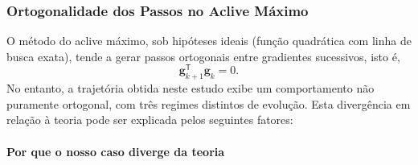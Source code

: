 \documentclass[12pt]{article}
\begin{document}
\subsubsection*{Ortogonalidade dos Passos no Aclive Máximo}

O método do aclive máximo, sob hipóteses ideais (função quadrática com linha de busca exata), tende a gerar passos ortogonais entre gradientes sucessivos, isto é,
\[
\mathbf{g}_{k+1}^{\mathsf T}\mathbf{g}_{k} = 0.
\]
No entanto, a trajetória obtida neste estudo exibe um comportamento não puramente ortogonal, com três regimes distintos de evolução. Esta divergência em relação à teoria pode ser explicada pelos seguintes fatores:

\paragraph{Por que o nosso caso diverge da teoria}
\end{document}

